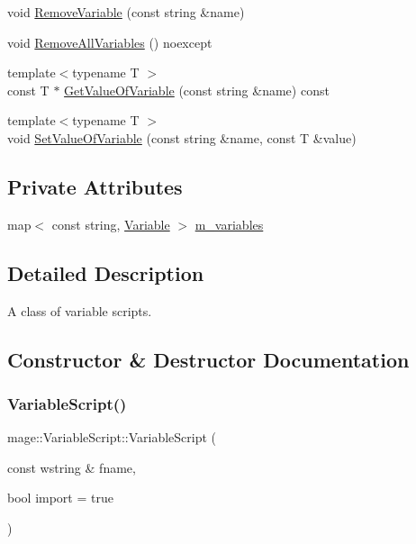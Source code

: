 \begin{DoxyCompactItemize}
\item 
void \hyperlink{classmage_1_1_variable_script_a4970ef4faafb1a6a43c4648ec9f36cce}{Remove\+Variable} (const string \&name)
\item 
void \hyperlink{classmage_1_1_variable_script_af83059a4ce77ebd1ae042707d0acf750}{Remove\+All\+Variables} () noexcept
\item 
{\footnotesize template$<$typename T $>$ }\\const T $\ast$ \hyperlink{classmage_1_1_variable_script_a231b83e1e32b882489ed90faa69f7137}{Get\+Value\+Of\+Variable} (const string \&name) const
\item 
{\footnotesize template$<$typename T $>$ }\\void \hyperlink{classmage_1_1_variable_script_a309360848e9261773b1c6e9f8dcee7a1}{Set\+Value\+Of\+Variable} (const string \&name, const T \&value)
\end{DoxyCompactItemize}
\subsection*{Private Attributes}
\begin{DoxyCompactItemize}
\item 
map$<$ const string, \hyperlink{structmage_1_1_variable}{Variable} $>$ \hyperlink{classmage_1_1_variable_script_aec3791e021e66904862f91e65f0389c4}{m\+\_\+variables}
\end{DoxyCompactItemize}


\subsection{Detailed Description}
A class of variable scripts. 

\subsection{Constructor \& Destructor Documentation}
\hypertarget{classmage_1_1_variable_script_a4b4028a9710fcfc5fb26bb63922a90cb}{}\label{classmage_1_1_variable_script_a4b4028a9710fcfc5fb26bb63922a90cb} 
\subsubsection{\texorpdfstring{Variable\+Script()}{VariableScript()}\hspace{0.1cm}{\footnotesize\ttfamily [1/3]}}
{\footnotesize\ttfamily mage\+::\+Variable\+Script\+::\+Variable\+Script (\begin{DoxyParamCaption}\item[{const wstring \&}]{fname,  }\item[{bool}]{import = {\ttfamily true} }\end{DoxyParamCaption})\hspace{0.3cm}{\ttfamily [explicit]}}

